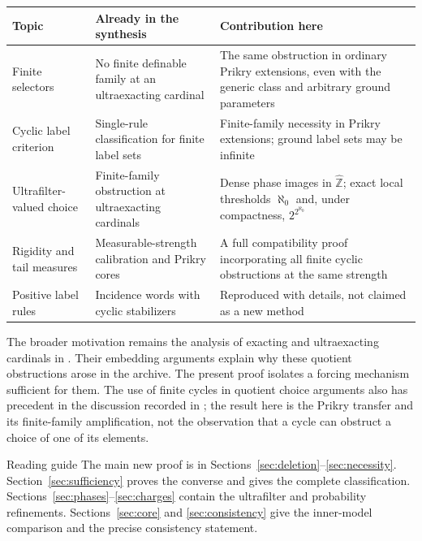 \documentclass[11pt,letterpaper]{article}
\theoremstyle{definition}
\numberwithin{equation}{section}
\newcommand{\zhat}{\widehat{\mathbb Z}}
\begin{document}
\begin{center}
\small
\renewcommand{\arraystretch}{1.18}
\begin{tabularx}{\textwidth}{@{}P{.29\textwidth}YY@{}}
\toprule
\textbf{Topic}&\textbf{Already in the synthesis}&\textbf{Contribution here}\\
\midrule
Finite selectors&No finite definable family at an ultraexacting cardinal&The same obstruction in ordinary Prikry extensions, even with the generic class and arbitrary ground parameters\\
Cyclic label criterion&Single-rule classification for finite label sets&Finite-family necessity in Prikry extensions; ground label sets may be infinite\\
Ultrafilter-valued choice&Finite-family obstruction at ultraexacting cardinals&Dense phase images in $\zhat$; exact local thresholds $\aleph_0$ and, under compactness, $2^{2^{\aleph_0}}$\\
Rigidity and tail measures&Measurable-strength calibration and Prikry cores&A full compatibility proof incorporating all finite cyclic obstructions at the same strength\\
Positive label rules&Incidence words with cyclic stabilizers&Reproduced with details, not claimed as a new method\\
\bottomrule
\end{tabularx}
\end{center}

The broader motivation remains the analysis of exacting and ultraexacting
cardinals in \cite{abl,abgl}. Their embedding arguments explain why these
quotient obstructions arose in the archive. The present proof isolates a
forcing mechanism sufficient for them. The use of finite cycles in quotient
choice arguments also has precedent in the discussion recorded in
\cite[Remark 2.4]{goldberg}; the result here is the Prikry transfer and its
finite-family amplification, not the observation that a cycle can obstruct
a choice of one of its elements.

\begin{assessment}{Reading guide}
The main new proof is in Sections~\ref{sec:deletion}--\ref{sec:necessity}.
Section~\ref{sec:sufficiency} proves the converse and gives the complete
classification. Sections~\ref{sec:phases}--\ref{sec:charges} contain the
ultrafilter and probability refinements. Sections~\ref{sec:core} and
\ref{sec:consistency} give the inner-model comparison and the precise
consistency statement.
\end{assessment}
\end{document}
